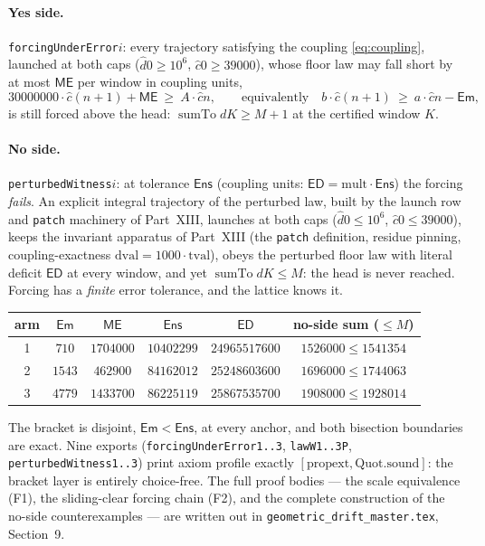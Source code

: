\documentclass[11pt]{article}
\newcommand{\dhat}{\widehat{d}}
\newcommand{\chat}{\widehat{c}}
\newcommand{\sumto}{\operatorname{sumTo}}
\begin{document}
\paragraph{Yes side.} \texttt{forcingUnderError$i$}: every trajectory satisfying the coupling
\eqref{eq:coupling}, launched at both caps ($\dhat 0\ge 10^6$, $\chat 0\ge 39000$), whose
floor law may fall short by at most $\mathsf{ME}$ per window in coupling units,
\[
30000000\cdot \chat(n+1)+\mathsf{ME}\ \ge\ A\cdot \chat n,
\qquad\text{equivalently}\quad b\cdot \chat(n+1)\ \ge\ a\cdot \chat n-\mathsf{Em},
\]
is still forced above the head: $\sumto d K \ge M+1$ at the certified window $K$.

\paragraph{No side.} \texttt{perturbedWitness$i$}: at tolerance $\mathsf{Ens}$ (coupling
units: $\mathsf{ED}=\mathrm{mult}\cdot\mathsf{Ens}$) the forcing \emph{fails}. An explicit
integral trajectory of the perturbed law, built by the launch row and \texttt{patch}
machinery of Part~XIII, launches at both caps ($\dhat 0\le 10^6$, $\chat 0\le 39000$), keeps
the invariant apparatus of Part~XIII (the \texttt{patch} definition, residue pinning,
coupling-exactness $\mathrm{dval}=1000\cdot\mathrm{tval}$), obeys the perturbed floor law
with literal deficit $\mathsf{ED}$ at every window, and yet $\sumto d K\le M$: the head is
never reached. Forcing has a \emph{finite} error tolerance, and the lattice knows it.

\begin{center}
\begin{tabular}{c c c c c c}
\hline
\textbf{arm} & $\mathsf{Em}$ & $\mathsf{ME}$ & $\mathsf{Ens}$ & $\mathsf{ED}$ &
\textbf{no-side sum} ($\le M$)\\
\hline
1 & $710$ & $1704000$ & $10402299$ & $24965517600$ & $1526000\le 1541354$\\
2 & $1543$ & $462900$ & $84162012$ & $25248603600$ & $1696000\le 1744063$\\
3 & $4779$ & $1433700$ & $86225119$ & $25867535700$ & $1908000\le 1928014$\\
\hline
\end{tabular}
\end{center}

The bracket is disjoint, $\mathsf{Em}<\mathsf{Ens}$, at every anchor, and both bisection
boundaries are exact. Nine exports (\texttt{forcingUnderError1..3}, \texttt{lawW1..3P},
\texttt{perturbedWitness1..3}) print axiom profile exactly
$[\mathrm{propext},\mathrm{Quot.sound}]$: the bracket layer is entirely choice-free. The
full proof bodies --- the scale equivalence (F1), the sliding-clear forcing chain (F2), and
the complete construction of the no-side counterexamples --- are written out in
\texttt{geometric\_drift\_master.tex}, Section~9.
\end{document}
